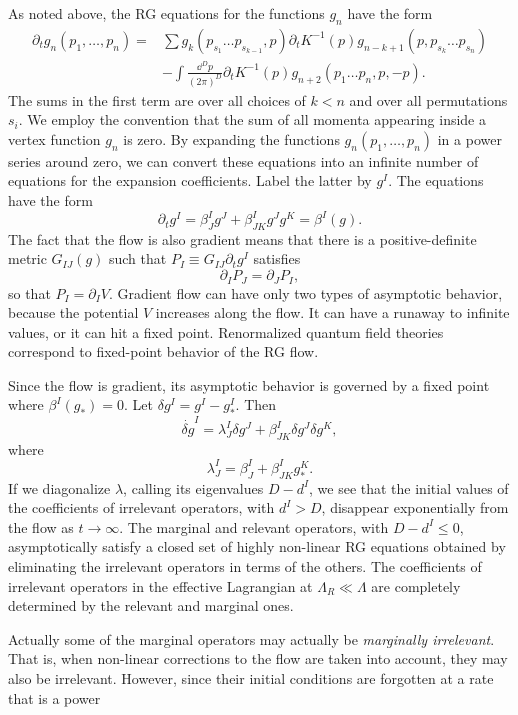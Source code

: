 As noted above, the RG equations for the functions $g_n$ have the form
\[
\begin{aligned}
  \partial_tg_n(p_1,\ldots,p_n)={}&\sum
  g_k(p_{s_1}\ldots p_{s_{k-1}},p)\partial_tK^{-1}(p)
  g_{n-k+1}(p,p_{s_k}\ldots p_{s_n})\\
  &-\int\frac{\dd^D p}{(2\pi)^D}\partial_tK^{-1}(p)
  g_{n+2}(p_1\ldots p_n,p,-p) .
\end{aligned}
\]
The sums in the first term are over all choices of $k<n$ and over all
permutations $s_i$. We employ the convention that the sum of all momenta
appearing inside a vertex function $g_n$ is zero. By expanding the functions
$g_n(p_1,\ldots,p_n)$ in a power series around zero, we can convert these
equations into an infinite number of equations for the expansion coefficients.
Label the latter by $g^I$. The equations have the form
\[
  \partial_tg^I=\beta^I_Jg^J+\beta^I_{JK}g^Jg^K=\beta^I(g) .
\]
The fact that the flow is also gradient means that there is a positive-definite
metric $G_{IJ}(g)$ such that
$P_I\equiv G_{IJ}\partial_tg^I$ satisfies
\[
  \partial_IP_J=\partial_JP_I,
\]
so that $P_I=\partial_IV$. Gradient flow can have only two types of
asymptotic behavior, because the potential $V$ increases along the flow. It
can have a runaway to infinite values, or it can hit a fixed point. Renormalized
quantum field theories correspond to fixed-point behavior of the RG flow.

Since the flow is gradient, its asymptotic behavior is governed by a fixed
point where $\beta^I(g_*)=0$. Let $\delta g^I=g^I-g_*^I$. Then
\[
  \dot{\delta g}^I=\lambda^I_J\delta g^J
  +\beta^I_{JK}\delta g^J\delta g^K,
\]
where
\[
  \lambda^I_J=\beta^I_J+\beta^I_{JK}g_*^K .
\]
If we diagonalize $\lambda$, calling its eigenvalues $D-d^I$, we see that
the initial values of the coefficients of irrelevant operators, with $d^I>D$,
disappear exponentially from the flow as $t\to\infty$. The marginal and
relevant operators, with $D-d^I\leq0$, asymptotically satisfy a closed set of
highly non-linear RG equations obtained by eliminating the irrelevant
operators in terms of the others. The coefficients of irrelevant operators in
the effective Lagrangian at $\Lambda_R\ll\Lambda$ are completely determined
by the relevant and marginal ones.

Actually some of the marginal operators may actually be \emph{marginally
irrelevant}. That is, when non-linear corrections to the flow are taken into
account, they may also be irrelevant. However, since their initial conditions
are forgotten at a rate that is a power

